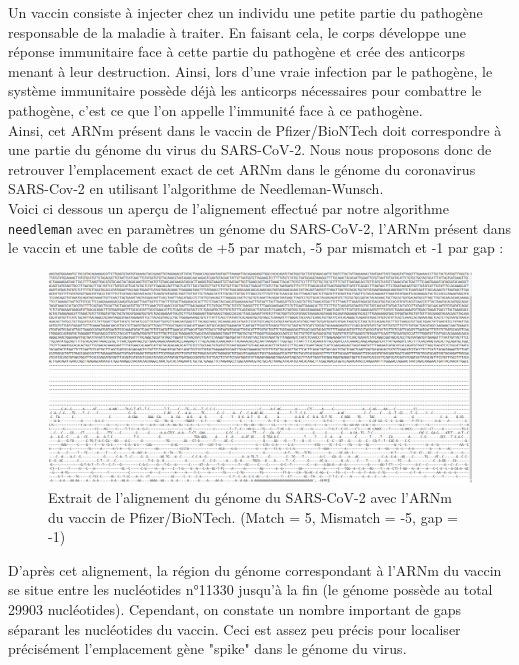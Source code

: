 \documentclass[12pt]{article}
\begin{document}
Un vaccin consiste à injecter chez un individu une petite partie du pathogène responsable de la maladie à traiter. En faisant cela, le corps développe une réponse immunitaire face à cette partie du pathogène et crée des anticorps menant à leur destruction. Ainsi, lors d'une vraie infection par le pathogène, le système immunitaire possède déjà les anticorps nécessaires pour combattre le pathogène, c'est ce que l'on appelle l'immunité face à ce pathogène.\\

Ainsi, cet ARNm présent dans le vaccin de Pfizer/BioNTech doit correspondre à une partie du génome du virus du SARS-CoV-2. Nous nous proposons donc de retrouver l'emplacement exact de cet ARNm dans le génome du coronavirus SARS-Cov-2 en utilisant l'algorithme de Needleman-Wunsch.\\

Voici ci dessous un aperçu de l'alignement effectué par notre algorithme \texttt{needleman} avec en paramètres un génome du SARS-CoV-2, l'ARNm présent dans le vaccin et une table de coûts de +5 par match, -5 par mismatch et -1 par gap :


\begin{figure}[!h]
    \centering
    \includegraphics[scale = 0.347]{Images/Needleman/homemade needleman.png}
    \caption{Extrait de l'alignement du génome du SARS-CoV-2 avec l'ARNm du vaccin de Pfizer/BioNTech. (Match = 5, Mismatch = -5, gap = -1)}
    \label{alignement du génome du SARS_CoV-2 avec l'ARNm du vaccin de Pfizer/BioNTech. (Match = 5, Mismatch = -5, gap = -1)}
\end{figure}


D'après cet alignement, la région du génome correspondant à l'ARNm du vaccin se situe entre les nucléotides n°11330 jusqu'à la fin (le génome possède au total 29903 nucléotides). Cependant, on constate un nombre important de gaps séparant les nucléotides du vaccin. Ceci est assez peu précis pour localiser précisément l'emplacement gène "spike" dans le génome du virus.
\end{document}
